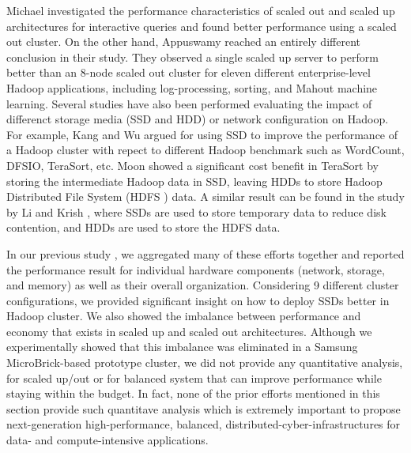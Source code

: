 \documentclass[journal]{IEEEtran}
\begin{document}
Michael \cite{scaleupscaleout:michael} investigated the performance characteristics of scaled out and scaled up architectures for interactive queries and found better performance using a scaled out cluster. On the other hand, Appuswamy \cite{scaleupscaleout:appuswamy} reached an entirely different conclusion in their study. They observed a single scaled up server to perform better than an 8-node scaled out cluster for eleven different enterprise-level Hadoop applications, including log-processing, sorting, and Mahout machine learning. Several studies have also been performed evaluating the impact of differenct storage media (SSD and HDD) or network configuration on Hadoop. For example, Kang \cite{ssdhdd:kang}  and Wu \cite{ssdhdd:wu} argued for using SSD  to improve the performance of a Hadoop cluster with repect to different Hadoop benchmark such as WordCount, DFSIO, TeraSort, etc. Moon \cite{ssdhdd:moon} showed a significant cost benefit in TeraSort by storing the intermediate Hadoop data in SSD, leaving HDDs to store Hadoop Distributed File System (HDFS \cite{fw:hdfs}) data. A similar result can be found in the study by Li \cite{ssdhdd:li} and Krish \cite{ssdhdd:krish}, where SSDs are used to store temporary data to reduce disk contention, and HDDs are used to store the HDFS data. 

In our previous study \cite{scaleupscaleout:das2015evaluating}, we aggregated many of these efforts together and reported the performance result for individual hardware components (network, storage, and memory) as well as their overall organization. Considering 9 different cluster configurations, we provided significant insight on  how to deploy SSDs better in Hadoop cluster. We also showed the imbalance between performance and economy that exists in scaled up and scaled out architectures. Although we experimentally showed that this imbalance was eliminated in a Samsung MicroBrick-based prototype cluster, we did not provide any quantitative analysis, for scaled up/out or for balanced system that can improve performance while staying within the budget. In fact, none of the prior efforts mentioned in this section provide such quantitave analysis which is extremely important to propose next-generation high-performance, balanced, distributed-cyber-infrastructures for data- and compute-intensive applications.
\end{document}
